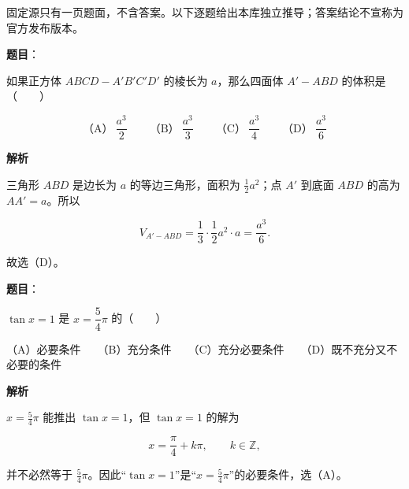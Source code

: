 

\begin{gktip}
固定源只有一页题面，不含答案。以下逐题给出本库独立推导；答案结论不宣称为官方发布版本。
\end{gktip}

\begin{answer}

\textbf{题目}：

如果正方体 $ABCD-A'B'C'D'$ 的棱长为 $a$，那么四面体 $A'-ABD$ 的体积是\mbox{（　　）}

\nopagebreak[4]
\[
\text{（A）}\ \frac{a^3}{2}
\qquad
\text{（B）}\ \frac{a^3}{3}
\qquad
\text{（C）}\ \frac{a^3}{4}
\qquad
\text{（D）}\ \frac{a^3}{6}
\]

\textbf{解析}

三角形 $ABD$ 是边长为 $a$ 的等边三角形，面积为 $\frac12a^2$；点 $A'$ 到底面 $ABD$ 的高为 $AA'=a$。所以

\nopagebreak[4]
\[
V_{A'-ABD}=\frac13\cdot\frac12a^2\cdot a=\frac{a^3}{6}.
\]

故选（D）。


\end{answer}
\begin{answer}

\textbf{题目}：

$\tan x=1$ 是 $x=\dfrac54\pi$ 的\mbox{（　　）}

（A）必要条件　　（B）充分条件　　（C）充分必要条件　　（D）既不充分又不必要的条件

\textbf{解析}

$x=\frac54\pi$ 能推出 $\tan x=1$，但 $\tan x=1$ 的解为

\nopagebreak[4]
\[
x=\frac\pi4+k\pi,\qquad k\in\mathbb Z,
\]

并不必然等于 $\frac54\pi$。因此“$\tan x=1$”是“$x=\frac54\pi$”的必要条件，选（A）。


\end{answer}
